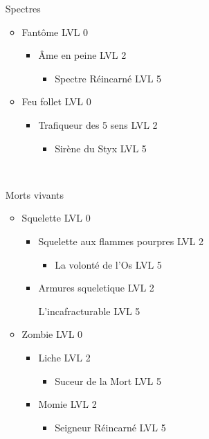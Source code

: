 \begin{itemize}
	\item[Spectres]~\\
		\begin{itemize}
			\item Fantôme LVL 0
				\begin{itemize}
					\item Âme en peine LVL 2
						\begin{itemize}
							\item Spectre Réincarné LVL 5
						\end{itemize}
				\end{itemize}
			\item Feu follet LVL 0
				\begin{itemize}
					\item Trafiqueur des 5 sens LVL 2
						\begin{itemize}
							\item Sirène du Styx LVL 5
						\end{itemize}
				\end{itemize}
		\end{itemize}~\\
	\item[Morts vivants] ~\\
		\begin{itemize}
			\item Squelette LVL 0
				\begin{itemize}
					\item Squelette aux flammes pourpres LVL 2
						\begin{itemize}
							\item La volonté de l'Os LVL 5
						\end{itemize}
					\item Armures squeletique LVL 2
						\begin{itemize}
							L'incafracturable LVL 5
						\end{itemize}
				\end{itemize}
			\item Zombie LVL 0
				\begin{itemize}
					\item Liche LVL 2
						\begin{itemize}
							\item Suceur de la Mort LVL 5
						\end{itemize}
					\item Momie LVL 2
						\begin{itemize}
							\item Seigneur Réincarné LVL 5

\end{itemize}
\end{itemize}
\end{itemize}
\end{itemize}
